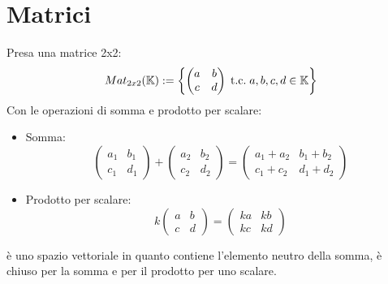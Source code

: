 \documentclass[a4paper,12pt]{article}
\begin{document}
	\section{Matrici}
	Presa una matrice 2x2:
	\[Mat_{2x2}(\mathbb{K}) := \left\{\begin{pmatrix} a & b \\ c & d\end{pmatrix} \;\text{t.c.}\; a,b,c,d \in \mathbb{K}\right\}\]
	Con le operazioni di somma e prodotto per scalare:
	\begin{itemize}
		\item Somma:
		\[\begin{pmatrix} a_1 & b_1 \\ c_1 & d_1 \end{pmatrix} + \begin{pmatrix} a_2 & b_2 \\ c_2 & d_2 \end{pmatrix} = 
		\begin{pmatrix} a_1 + a_2 & b_1 + b_2 \\ c_1 + c_2 & d_1 + d_2 \end{pmatrix}\]
		\item Prodotto per scalare:
		\[k\begin{pmatrix} a & b \\ c & d \end{pmatrix} = \begin{pmatrix} ka & kb \\ kc & kd \end{pmatrix}\]
	\end{itemize}
	è uno spazio vettoriale in quanto contiene l'elemento neutro della somma, è chiuso per la somma e per il prodotto per uno scalare.
	
\end{document}

